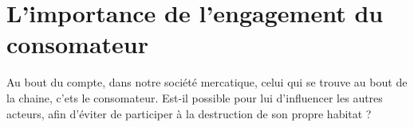 \section{L'importance de l'engagement du consomateur}

\smallbreak Au bout du compte, dans notre société mercatique, celui qui se trouve au bout de la chaine, c'ets le consomateur.
Est-il possible pour lui d'influencer les autres acteurs, afin d'éviter de participer à la destruction de son propre habitat ?
